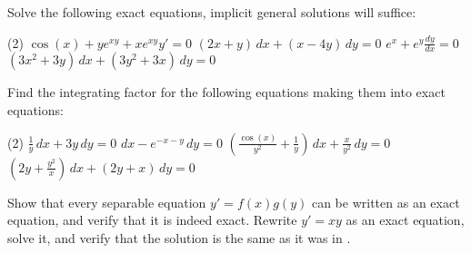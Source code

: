\setcounter{exercise}{100}

\begin{exercise}
Solve the following exact equations, implicit general solutions
will suffice:
\begin{tasks}(2)
\task
$\cos(x)+ye^{xy} + xe^{xy} y' = 0$
\task
$(2x+y)\, dx + (x-4y) \, dy = 0$
\task
$e^x + e^y \frac{dy}{dx} = 0$
\task
$(3x^2+3y)\,dx + (3y^2+3x)\, dy = 0$
\end{tasks}
\end{exercise}

\begin{samepage}
\begin{exercise}
Find the integrating factor for the following equations making them into
exact equations:
\begin{tasks}(2)
\task
$\frac{1}{y}\, dx + 3y \, dy = 0$
\task
$dx - e^{-x-y} \, dy = 0$
\task
$\left( \frac{\cos(x)}{y^2} + \frac{1}{y} \right) \, dx + \frac{x}{y^2} \, dy = 0$
\task
$\left( 2y + \frac{y^2}{x} \right) \, dx + ( 2y+x )\, dy = 0$
\end{tasks}
\end{exercise}
\end{samepage}

\begin{exercise}
\leavevmode
\begin{tasks}
\task
Show that every
separable equation $y' = f(x)g(y)$ can be written as an exact equation,
and verify that it is indeed exact.
\task Rewrite $y' = xy$ as an exact equation, solve it, and verify
that the solution is the same as it was in .
\end{tasks}
\end{exercise}


